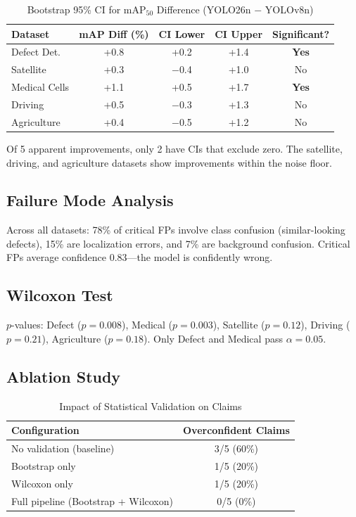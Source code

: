 \documentclass[10pt,twocolumn,letterpaper]{article}
\begin{document}
\begin{table}[htbp]
\centering
\caption{Bootstrap 95\% CI for mAP$_{50}$ Difference (YOLO26n $-$ YOLOv8n)}
\label{tab:bootstrap}
\begin{tabular}{@{}lcccc@{}}
\toprule
\textbf{Dataset} & \textbf{mAP Diff (\%)} & \textbf{CI Lower} & \textbf{CI Upper} & \textbf{Significant?} \\
\midrule
Defect Det. & +0.8 & +0.2 & +1.4 & \textbf{Yes} \\
Satellite & +0.3 & $-$0.4 & +1.0 & No \\
Medical Cells & +1.1 & +0.5 & +1.7 & \textbf{Yes} \\
Driving & +0.5 & $-$0.3 & +1.3 & No \\
Agriculture & +0.4 & $-$0.5 & +1.2 & No \\
\bottomrule
\end{tabular}
\end{table}

Of 5 apparent improvements, only 2 have CIs that exclude zero. The satellite, driving, and agriculture datasets show improvements within the noise floor.

\subsection{Failure Mode Analysis}
Across all datasets: 78\% of critical FPs involve class confusion (similar-looking defects), 15\% are localization errors, and 7\% are background confusion. Critical FPs average confidence 0.83---the model is confidently wrong.

\subsection{Wilcoxon Test}
$p$-values: Defect ($p = 0.008$), Medical ($p = 0.003$), Satellite ($p = 0.12$), Driving ($p = 0.21$), Agriculture ($p = 0.18$). Only Defect and Medical pass $\alpha = 0.05$.

\subsection{Ablation Study}
\begin{table}[htbp]
\centering
\caption{Impact of Statistical Validation on Claims}
\label{tab:ablation}
\begin{tabular}{@{}lc@{}}
\toprule
\textbf{Configuration} & \textbf{Overconfident Claims} \\
\midrule
No validation (baseline) & 3/5 (60\%) \\
Bootstrap only & 1/5 (20\%) \\
Wilcoxon only & 1/5 (20\%) \\
Full pipeline (Bootstrap + Wilcoxon) & 0/5 (0\%) \\
\bottomrule
\end{tabular}
\end{table}
\end{document}

